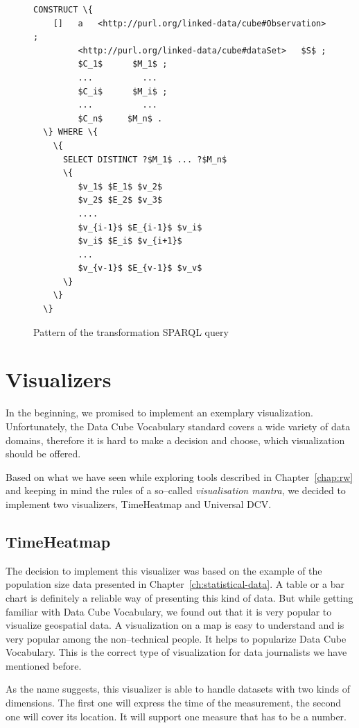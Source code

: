 \begin{figure}
\begin{Verbatim}[commandchars=\\\{\},codes={\catcode`$=3\catcode`_=8}]
  CONSTRUCT \{
    []   a   <http://purl.org/linked-data/cube#Observation> ;
         <http://purl.org/linked-data/cube#dataSet>   $S$ ;
         $C_1$      $M_1$ ;
         ...          ...
         $C_i$      $M_i$ ;
         ...          ...
         $C_n$     $M_n$ .
  \} WHERE \{
    \{
      SELECT DISTINCT ?$M_1$ ... ?$M_n$
      \{
         $v_1$ $E_1$ $v_2$
         $v_2$ $E_2$ $v_3$
         ....
         $v_{i-1}$ $E_{i-1}$ $v_i$
         $v_i$ $E_i$ $v_{i+1}$
         ...
         $v_{v-1}$ $E_{v-1}$ $v_v$
      \}
    \}
  \}
\end{Verbatim}
\label{fig:sparql-pattern}
\caption{Pattern of the transformation SPARQL query}
\end{figure}

\section{Visualizers}
In the beginning, we promised to implement an exemplary visualization.
Unfortunately, the Data Cube Vocabulary standard covers a wide variety of data domains, 
therefore it is hard to make a decision and choose, which visualization should be offered.

Based on what we have seen while exploring tools described in 
Chapter~\ref{chap:rw} and keeping in mind the rules of a so--called 
\emph{visualisation mantra}, we decided to implement two visualizers, 
TimeHeatmap and Universal DCV. 

\subsection{TimeHeatmap}
The decision to implement this visualizer was based on the example of the population size data
presented in Chapter~\ref{ch:statistical-data}. A table or a bar chart is 
definitely a reliable way of presenting this kind of data. But while getting 
familiar with Data Cube Vocabulary, we found out that it is very popular to 
visualize geospatial data. A visualization on a map is easy to understand and is
very popular among the non--technical people. It helps to popularize Data Cube 
Vocabulary. This is the correct type of visualization for data journalists we 
have mentioned before.

As the name suggests, this visualizer is able to handle datasets with two 
kinds of dimensions. The first one will express the time of the measurement, the 
second one will cover its location. It will support one measure that has to be 
a number.


